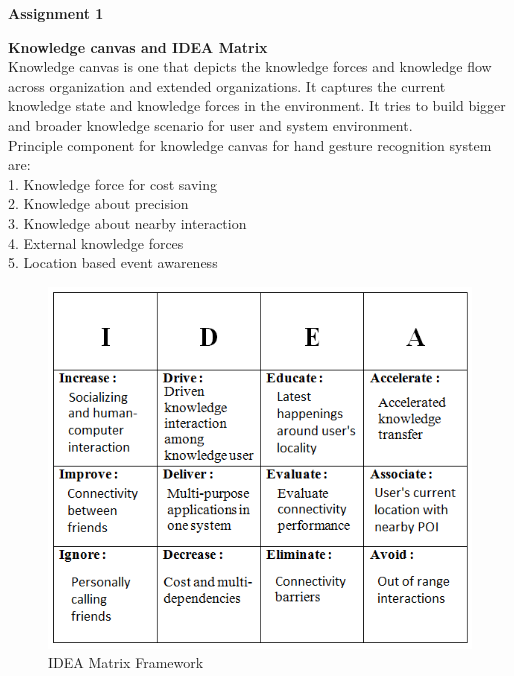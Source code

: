 \thispagestyle{empty}
\textbf{\hspace{55mm} \large Assignment 1}\\
\begin{enumerate}
\textbf{\hspace{35mm}  Knowledge canvas and IDEA Matrix }\\

\hspace*{0.325 in} Knowledge canvas is one that depicts the knowledge forces and knowledge flow across organization and extended organizations. It captures the current knowledge state and knowledge forces in the environment. It tries to build bigger and broader knowledge scenario for user and system environment. \\
\hspace*{0.3 in}Principle component for knowledge canvas for hand gesture recognition system are:\\
1.	Knowledge force for cost saving\\
2.	Knowledge about precision\\
3.	Knowledge about nearby interaction\\
4.	External knowledge forces\\
5.	Location based event awareness\\
\begin{figure}[h]
\centering
\includegraphics[scale=0.7]{idea.png}
\caption{IDEA Matrix Framework}
\end{figure}
\end{enumerate}
